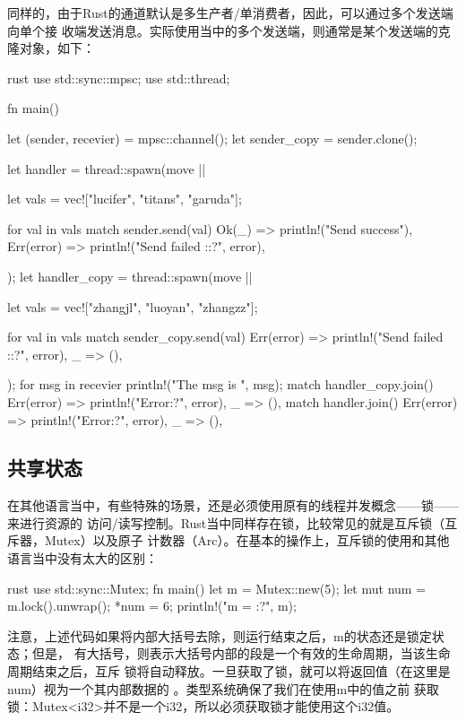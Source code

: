 同样的，由于Rust的通道默认是多生产者/单消费者，因此，可以通过多个发送端向单个接
收端发送消息。实际使用当中的多个发送端，则通常是某个发送端的克隆对象，如下：
\begin{code-block}{rust}
use std::sync::mpsc;
use std::thread;

fn main() {
    let (sender, recevier) = mpsc::channel();
    let sender_copy = sender.clone();

    let handler = thread::spawn(move || {
        let vals = vec!["lucifer", "titans", "garuda"];

        for val in vals {
            match sender.send(val) {
                Ok(_) => println!("Send success"),
                Err(error) => println!("Send failed :{:?}", error),
            }
        }
    });
    let handler_copy = thread::spawn(move || {
        let vals = vec!["zhangjl", "luoyan", "zhangzz"];

        for val in vals {
            match sender_copy.send(val) {
                Err(error) => println!("Send failed :{:?}", error),
                _ => (),
            }
        }
    });
    for msg in recevier {
        println!("The msg is {}", msg);
    }
    match handler_copy.join() {
        Err(error) => println!("Error{:?}", error),
        _ => (),
    }
    match handler.join() {
        Err(error) => println!("Error{:?}", error),
        _ => (),
    }
}
\end{code-block}

\subsection{共享状态}
在其他语言当中，有些特殊的场景，还是必须使用原有的线程并发概念——锁——来进行资源的
访问/读写控制。Rust当中同样存在锁，比较常见的就是互斥锁（互斥器，Mutex）以及原子
计数器（Arc）。在基本的操作上，互斥锁的使用和其他语言当中没有太大的区别：
\begin{code-block}{rust}
use std::sync::Mutex;
fn main() {
    let m = Mutex::new(5);
    {
        let mut num = m.lock().unwrap();
        *num = 6;
    }
    println!("m = {:?}", m);
}
\end{code-block}
注意，上述代码如果将内部大括号去除，则运行结束之后，m的状态还是锁定状态；但是，
有大括号，则表示大括号内部的段是一个有效的生命周期，当该生命周期结束之后，互斥
锁将自动释放。一旦获取了锁，就可以将返回值（在这里是num）视为一个其内部数据的
。类型系统确保了我们在使用m中的值之前
获取锁：Mutex<i32>并不是一个i32，所以必须获取锁才能使用这个i32值。

